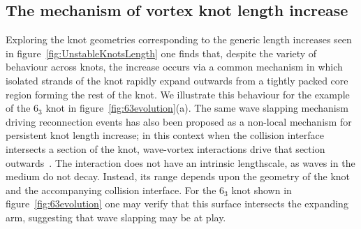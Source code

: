 \subsection{The mechanism of vortex knot length increase}
\label{subsec:Mechanism}
\begin{figure*}[hbtp]
    \caption{(overpage) Dynamics of the $6_3$ knot. (a) From $T=0$ to $T=2000$ the knot contracts and flattens, behaviour caused by the intrinsic curvature driven dynamics of an isolated filament mimicking a line tension. From $T=2000$ onwards length increases, with a single arm of the knot rapidly expanding outwards from an otherwise tightly packed core. (b) Comparison of the length evolution of the fully interacting $6_3$ vortex filament at $T=2000$ (green) to a copy encased in a `glass tube' of radius 10 (blue) or 15 (orange). With long-ranged interactions removed, the knot does not expand, but rather settles to a length of $\sim 400$ -- $600$. (c) Initial divergence in geometries between the interacting $6_3$ knot (green curve) and the radius $10$ tubed one (blue curve). Divergence does not occur globally, but is localised to two distinct expanding segments outside the lengthscale defined by the tube. (d) Distribution of filament twist during knot expansion. The expanding arm of the knot has twist values well below the $0.024$ rotations per space unit threshold for the sproing instability, and is less highly twisted than other, non-expanding, segments of the knot, ruling out this instability as the cause of length increase.}
\label{fig:63evolution} 
\end{figure*}
Exploring the knot geometries corresponding to the generic length increases seen in figure~\ref{fig:UnstableKnotsLength} one finds that, despite the variety of behaviour across knots, the increase occurs via a common mechanism in which isolated strands of the knot rapidly expand outwards from a tightly packed core region forming the rest of the knot. We illustrate this behaviour for the example of the $6_3$ knot in figure~\ref{fig:63evolution}(a). The same wave slapping mechanism driving reconnection events has also been proposed as a non-local mechanism for persistent knot length increase; in this context when the collision interface intersects a section of the knot, wave-vortex interactions drive that section outwards~\citep{WinfreeChapter,Sutcliffe2003}. The interaction does not have an intrinsic lengthscale, as waves in the medium do not decay. Instead, its range depends upon the geometry of the knot and the accompanying collision interface. For the $6_3$ knot shown in figure~\ref{fig:63evolution} one may verify that this surface intersects the expanding arm, suggesting that wave slapping may be at play. 

